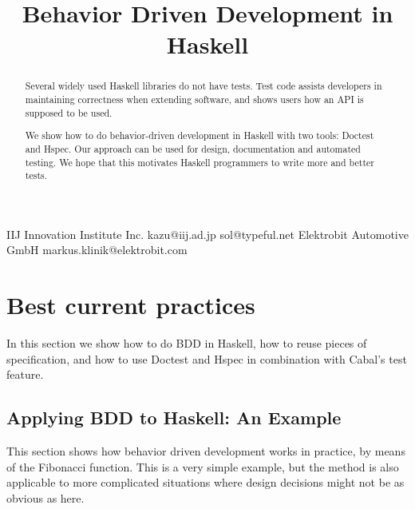 \documentclass[preprint]{sigplanconf}
\begin{document}
\copyrightdata{[to be supplied]}


\title{Behavior Driven Development in Haskell}

           {IIJ Innovation Institute Inc.}
           {kazu@iij.ad.jp}
           {}
           {sol@typeful.net}
           {Elektrobit Automotive GmbH}
           {markus.klinik@elektrobit.com}

\maketitle

\begin{abstract}
Several widely used Haskell libraries do not have tests.  Test code
assists developers in maintaining correctness when extending software,
and shows users how an API is supposed to be used.

We show how to do behavior-driven development in Haskell with two
tools: Doctest and Hspec.  Our approach can be used for design,
documentation and automated testing.  We hope that this motivates
Haskell programmers to write more and better tests.
\end{abstract}

\section{Best current practices}
\label{sec:best-current-practice}

In this section we show how to do BDD in Haskell, how to reuse pieces
of specification, and how to use Doctest and Hspec in combination with
Cabal's test feature.

\subsection{Applying BDD to Haskell: An Example}
\label{sec:bcp-example}
This section shows how behavior driven development works in practice,
by means of the Fibonacci function.  This is a very simple
example, but the method is also applicable to more complicated
situations where design decisions might not be as obvious as here.
\end{document}

